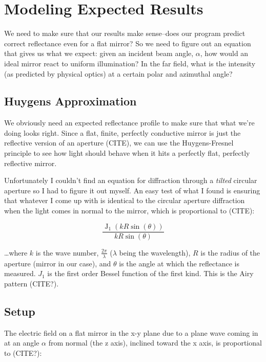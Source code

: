 \documentclass[etd,oneside,senior]{BYUPhys}
\DeclareMathOperator{\J}{J}
\begin{document}
\section{Modeling Expected Results} \label{sec:expected_results}

We need to make sure that our results make sense--does our program predict correct reflectance even for a flat mirror? So we need to figure out an equation that gives us what we expect: given an incident beam angle, $\alpha$, how would an ideal mirror react to uniform illumination? In the far field, what is the intensity (as predicted by physical optics) at a certain polar and azimuthal angle?

\subsection{Huygens Approximation} \label{subsec:huygens_approx}

We obviously need an expected reflectance profile to make sure that what we're doing looks right. Since a flat, finite, perfectly conductive mirror is just the reflective version of an aperture (CITE), we can use the Huygens-Fresnel principle to see how light should behave when it hits a perfectly flat, perfectly reflective mirror.

Unfortunately I couldn't find an equation for diffraction through a \textit{tilted} circular aperture so I had to figure it out myself. An easy test of what I found is ensuring that whatever I come up with is identical to the circular aperture diffraction when the light comes in normal to the mirror, which is proportional to (CITE):

\begin{equation}\label{eq:airy}
  \frac{\J_1(kR\sin(\theta))}{kR\sin(\theta)}
\end{equation}

\ldots where $k$ is the wave number, $\frac{2\pi}{\lambda}$ ($\lambda$ being the wavelength), $R$ is the radius of the aperture (mirror in our case), and $\theta$ is the angle at which the reflectance is measured. $J_1$ is the first order Bessel function of the first kind. This is the Airy pattern (CITE?).

\subsection{Setup} \label{sec:setup}

The electric field on a flat mirror in the x-y plane due to a plane wave coming in at an angle $\alpha$ from normal (the z axis), inclined toward the x axis, is proportional to (CITE?):
\end{document}

